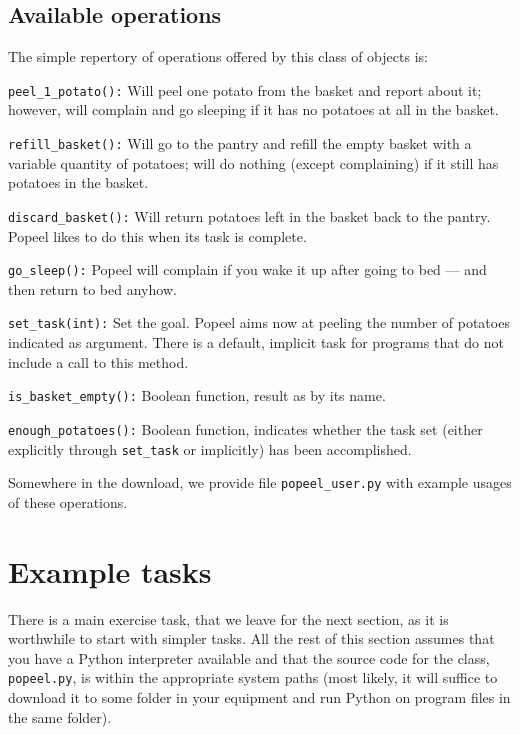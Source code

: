 \documentclass[12pt]{article}
\begin{document}
\subsection{Available operations}

The simple repertory of operations
offered by this class of objects is:

\begin{description}
\item{{\tt peel_1_potato():}} Will peel one potato
from the basket and report about it; however, will
complain and go sleeping if it has no potatoes at all
in the basket.
\item{{\tt refill_basket():}} Will go to the pantry
and refill the empty basket with a variable 
quantity of potatoes; will do nothing (except complaining)
if it still has potatoes in the basket. 
\item{{\tt discard_basket():}} Will return potatoes
left in the basket back to the pantry. Popeel likes
to do this when its task is complete. 
\item{{\tt go_sleep():}} Popeel will complain if you
wake it up after going to bed --- and then return to
bed anyhow.
\item{{\tt set_task(int):}} Set the goal. Popeel aims now 
at peeling the number of potatoes indicated as argument.
There is a default, implicit task for programs 
that do not include a call to this method.
\item{{\tt is_basket_empty():}} Boolean function, 
result as by its name.
\item{{\tt enough_potatoes():}} Boolean function, indicates
whether the task set (either explicitly through {\tt set_task}
or implicitly) has been accomplished. 
\end{description}

Somewhere in the download, we provide file 
{\tt popeel_user.py} 
with example usages of these operations.


\section{Example tasks}

There is a main exercise task, that we leave for the 
next section, as
it
is worthwhile to start with simpler tasks. All
the rest of this section assumes that you have
a Python interpreter available and that the
source code for the class, {\tt popeel.py}, is within
the appropriate system paths (most likely, it will
suffice to download it to some folder in your 
equipment and run Python on program files in
the same folder).
\end{document}
